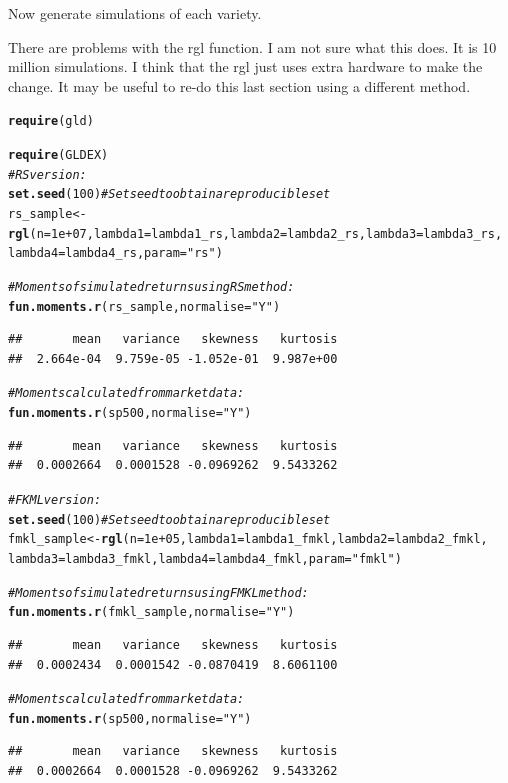 \documentclass[12pt, a4paper, oneside]{article}\usepackage[]{graphicx}\usepackage[]{color}
\makeatletter
\newcommand{\hlstr}[1]{\textcolor[rgb]{0.192,0.494,0.8}{#1}}%
\newcommand{\hlcom}[1]{\textcolor[rgb]{0.678,0.584,0.686}{\textit{#1}}}%
\newcommand{\hlkwd}[1]{\textcolor[rgb]{0.737,0.353,0.396}{\textbf{#1}}}%
\newenvironment{kframe}{%
 \def\at@end@of@kframe{}%
 \ifinner\ifhmode%
  \def\at@end@of@kframe{\end{minipage}}%
  \begin{minipage}{\columnwidth}%
 \fi\fi%
 \def\FrameCommand##1{\hskip\@totalleftmargin \hskip-\fboxsep
 \colorbox{shadecolor}{##1}\hskip-\fboxsep
     \hskip-\linewidth \hskip-\@totalleftmargin \hskip\columnwidth}%
 \MakeFramed {\advance\hsize-\width
   \@totalleftmargin\z@ \linewidth\hsize
   \@setminipage}}%
 {\par\unskip\endMakeFramed%
 \at@end@of@kframe}
\newenvironment{knitrout}{}{} %
\makeatother
\begin{document}
Now generate simulations of each variety. 

There are problems with the rgl function.  I am not sure what this does.  It is 10 million simulations.  I think that the rgl just uses extra hardware to make the change. It may be useful to re-do this last section using a different method. 
\begin{knitrout}
\color{fgcolor}\begin{kframe}
\begin{alltt}
\hlkwd{require}(gld)
\end{alltt}


{\ttfamily\noindent\itshape\color{messagecolor}{\#\# Loading required package: gld}}\begin{alltt}
\hlkwd{require}(GLDEX)
\hlcom{# RS version:}
\hlkwd{set.seed}(100)  \hlcom{# Set seed to obtain a reproducible set}
rs_sample <- \hlkwd{rgl}(n = 1e+07, lambda1 = lambda1_rs, lambda2 = lambda2_rs, lambda3 = lambda3_rs, 
    lambda4 = lambda4_rs, param = \hlstr{"rs"})

\hlcom{# Moments of simulated returns using RS method:}
\hlkwd{fun.moments.r}(rs_sample, normalise = \hlstr{"Y"})
\end{alltt}
\begin{verbatim}
##       mean   variance   skewness   kurtosis 
##  2.664e-04  9.759e-05 -1.052e-01  9.987e+00
\end{verbatim}
\begin{alltt}

\hlcom{# Moments calculated from market data:}
\hlkwd{fun.moments.r}(sp500, normalise = \hlstr{"Y"})
\end{alltt}
\begin{verbatim}
##       mean   variance   skewness   kurtosis 
##  0.0002664  0.0001528 -0.0969262  9.5433262
\end{verbatim}
\begin{alltt}

\hlcom{# FKML version:}
\hlkwd{set.seed}(100)  \hlcom{# Set seed to obtain a reproducible set}
fmkl_sample <- \hlkwd{rgl}(n = 1e+05, lambda1 = lambda1_fmkl, lambda2 = lambda2_fmkl, 
    lambda3 = lambda3_fmkl, lambda4 = lambda4_fmkl, param = \hlstr{"fmkl"})

\hlcom{# Moments of simulated returns using FMKL method:}
\hlkwd{fun.moments.r}(fmkl_sample, normalise = \hlstr{"Y"})
\end{alltt}
\begin{verbatim}
##       mean   variance   skewness   kurtosis 
##  0.0002434  0.0001542 -0.0870419  8.6061100
\end{verbatim}
\begin{alltt}

\hlcom{# Moments calculated from market data:}
\hlkwd{fun.moments.r}(sp500, normalise = \hlstr{"Y"})
\end{alltt}
\begin{verbatim}
##       mean   variance   skewness   kurtosis 
##  0.0002664  0.0001528 -0.0969262  9.5433262
\end{verbatim}
\end{kframe}
\end{knitrout}
\end{document}
